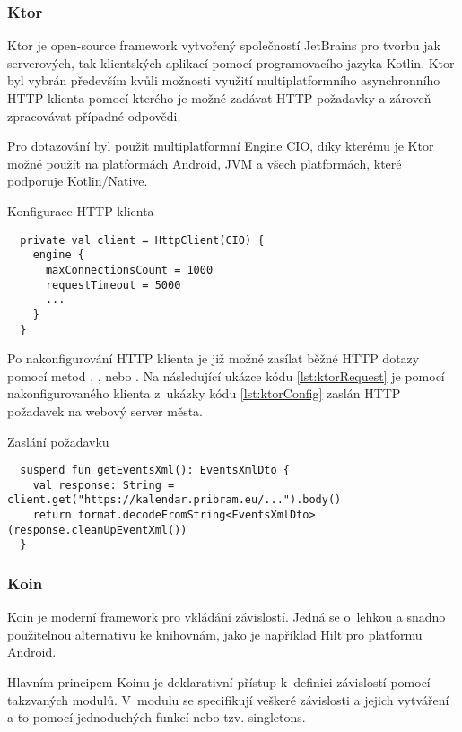 \subsubsection*{Ktor}
Ktor je open-source framework vytvořený společností JetBrains pro tvorbu jak serverových, tak klientských aplikací pomocí programovacího 
jazyka Kotlin. Ktor byl vybrán především kvůli možnosti využití multiplatformního asynchronního HTTP klienta pomocí kterého je možné zadávat 
HTTP požadavky a zároveň zpracovávat případné odpovědi. 

Pro dotazování byl použit multiplatformní Engine CIO, díky kterému je Ktor možné použít na platformách Android, JVM a všech platformách, které podporuje Kotlin/Native.
\begin{listing}[H]
\caption{Konfigurace HTTP klienta}\label{lst:ktorConfig}
\begin{verbatim}
  private val client = HttpClient(CIO) {
    engine {
      maxConnectionsCount = 1000
      requestTimeout = 5000
      ...
    }
  }
\end{verbatim}
\end{listing}

Po nakonfigurování HTTP klienta je již možné zasílat běžné HTTP dotazy pomocí metod , ,  nebo .
Na následující ukázce kódu \ref{lst:ktorRequest} je pomocí nakonfigurovaného klienta z~ukázky kódu \ref{lst:ktorConfig} zaslán HTTP požadavek
na webový server města.

\begin{listing}[H]
\caption{Zaslání požadavku}\label{lst:ktorRequest}
\begin{verbatim}
  suspend fun getEventsXml(): EventsXmlDto {
    val response: String = client.get("https://kalendar.pribram.eu/...").body()
    return format.decodeFromString<EventsXmlDto>(response.cleanUpEventXml())
  }
\end{verbatim}
\end{listing}

\subsubsection*{Koin}
Koin je moderní framework pro vkládání závislostí. Jedná se o~lehkou a snadno použitelnou alternativu 
ke knihovnám, jako je například Hilt pro platformu Android.

Hlavním principem Koinu je deklarativní přístup k~definici závislostí pomocí takzvaných modulů. V~modulu se specifikují veškeré závislosti a 
jejich vytváření a to pomocí jednoduchých funkcí nebo tzv. singletons. 

